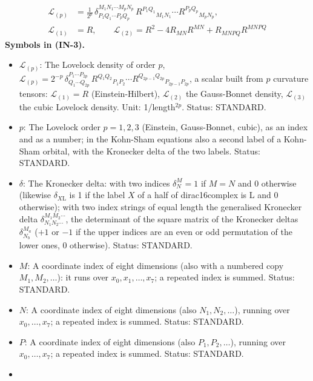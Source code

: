 \documentclass[
  10pt,
]{article}
\providecommand{\tightlist}{%
  \setlength{\itemsep}{0pt}\setlength{\parskip}{0pt}}
\begin{document}
\[
\begin{aligned}
\mathcal{L}_{(p)} &= \frac{1}{2^{p}}\,\delta^{M_1N_1\cdots M_pN_p}_{P_1Q_1\cdots P_pQ_p}\,
 R^{P_1Q_1}{}_{M_1N_1}\cdots R^{P_pQ_p}{}_{M_pN_p},\\
\mathcal{L}_{(1)} &= R,\qquad \mathcal{L}_{(2)} = R^2 - 4R_{MN}R^{MN} + R_{MNPQ}R^{MNPQ}
\end{aligned} \tag{IN-3}
\] \textbf{Symbols in (IN-3).}

\begin{itemize}
\tightlist
\item
  \(\mathcal{L}_{(p)}\): The Lovelock density of order \(p\),
  \(\mathcal{L}_{(p)} = 2^{-p}\,\delta^{P_1\cdots P_{2p}}_{Q_1\cdots Q_{2p}}\,R^{Q_1Q_2}{}_{P_1P_2}\cdots R^{Q_{2p-1}Q_{2p}}{}_{P_{2p-1}P_{2p}}\),
  a scalar built from \(p\) curvature tensors: \(\mathcal{L}_{(1)} = R\)
  (Einstein-Hilbert), \(\mathcal{L}_{(2)}\) the Gauss-Bonnet density,
  \(\mathcal{L}_{(3)}\) the cubic Lovelock density. Unit:
  1/length\(^{2p}\). Status: STANDARD.
\item
  \(p\): The Lovelock order \(p = 1, 2, 3\) (Einstein, Gauss-Bonnet,
  cubic), as an index and as a number; in the Kohn-Sham equations also a
  second label of a Kohn-Sham orbital, with the Kronecker delta of the
  two labels. Status: STANDARD.
\item
  \(\delta\): The Kronecker delta: with two indices \(\delta^M_N = 1\)
  if \(M = N\) and 0 otherwise (likewise \(\delta_{X\mathrm{L}}\) is 1
  if the label \(X\) of a half of dirac16complex is L and 0 otherwise);
  with two index strings of equal length the generalised Kronecker delta
  \(\delta^{M_1M_2\cdots}_{N_1N_2\cdots}\), the determinant of the
  square matrix of the Kronecker deltas \(\delta^{M_a}_{N_b}\) (\(+1\)
  or \(-1\) if the upper indices are an even or odd permutation of the
  lower ones, 0 otherwise). Status: STANDARD.
\item
  \(M\): A coordinate index of eight dimensions (also with a numbered
  copy \(M_1, M_2, \dots\)): it runs over \(x_0, x_1, \dots, x_7\); a
  repeated index is summed. Status: STANDARD.
\item
  \(N\): A coordinate index of eight dimensions (also
  \(N_1, N_2, \dots\)), running over \(x_0, \dots, x_7\); a repeated
  index is summed. Status: STANDARD.
\item
  \(P\): A coordinate index of eight dimensions (also
  \(P_1, P_2, \dots\)), running over \(x_0, \dots, x_7\); a repeated
  index is summed. Status: STANDARD.
\item

\end{itemize}
\end{document}
